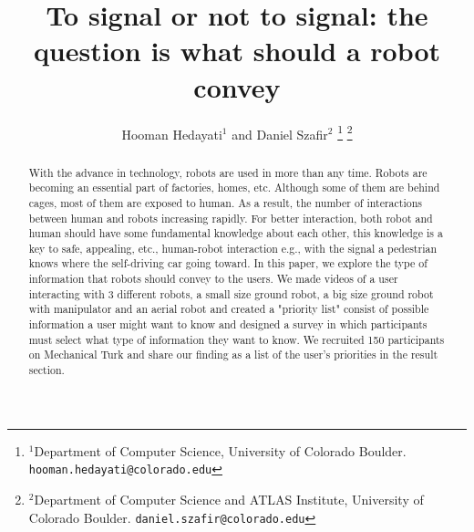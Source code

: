 \documentclass[letterpaper, 10 pt, conference]{ieeeconf}  %
\title{\LARGE \bf
To signal or not to signal: the question is what should a robot convey
}
\author{Hooman Hedayati$^{1}$ and Daniel Szafir$^{2}$%
\thanks{$^{1}$Department of Computer Science, University of Colorado Boulder.
        {\tt\small hooman.hedayati@colorado.edu}}%
	\thanks{$^{2}$Department of Computer Science and ATLAS Institute, University of Colorado Boulder.
		{\tt\small daniel.szafir@colorado.edu}}%
}
\begin{document}
\maketitle
\thispagestyle{empty}
\pagestyle{empty}


\begin{abstract}
With the advance in technology, robots are used in more than any time. Robots are becoming an essential part of factories, homes, etc. Although some of them are behind cages, most of them are exposed to human. As a result, the number of interactions between human and robots increasing rapidly. For better interaction, both robot and human should have some fundamental knowledge about each other, this knowledge is a key to safe, appealing, etc., human-robot interaction e.g., with the signal a pedestrian knows where the self-driving car going toward. In this paper, we explore the type of information that robots should convey to the users.  We made videos of a user interacting with 3 different robots, a small size ground robot, a big size ground robot with manipulator and an aerial robot and created a "priority list" consist of possible information a user might want to know and designed a survey in which participants must select what type of information they want to know. We recruited 150 participants on Mechanical Turk and share our finding as a list of the user's priorities in the result section.

\end{abstract}


\end{document}
